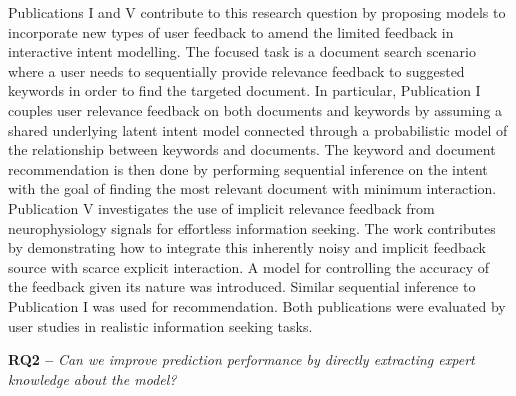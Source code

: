 \documentclass[dissertation,math,vertlayout,pdfa,colorlinks]{aaltoseries}
\begin{document}
Publications I and V contribute to this research question by proposing models to incorporate new types of user feedback to amend the limited feedback in interactive intent modelling. The focused task is a document search scenario where a user needs to sequentially provide relevance feedback to suggested keywords in order to find the targeted document. %
In particular, Publication I couples user relevance feedback on both documents and keywords by assuming a shared underlying latent intent model connected through a probabilistic model of the relationship between keywords and documents. The keyword and document recommendation is then done by performing sequential inference on the intent with the goal of finding the most relevant document with minimum interaction.
Publication V investigates the use of implicit relevance feedback from neurophysiology signals for effortless information seeking. The work contributes by demonstrating how to integrate this inherently noisy and implicit feedback source with scarce explicit interaction. A model for controlling the accuracy of the feedback given its nature %
was introduced. 
Similar sequential inference to Publication I was used for recommendation. 
Both publications were evaluated by user studies in realistic information seeking tasks. 


\noindent \textbf{RQ2 --} \textit{Can we improve prediction performance by directly extracting expert knowledge about the model?}
\end{document}
